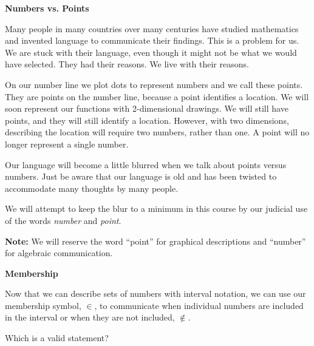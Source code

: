 \documentclass{ximera}
\begin{document}
\begin{warning}  \textbf{\textcolor{red!70!black}{Numbers vs. Points}} 

Many people in many countries over many centuries have studied mathematics and invented language to communicate their findings. This is a problem for us. We are stuck with their language, even though it might not be what we would have selected. They had their reasons.  We live with their reasons.

On our number line we plot dots to represent numbers and we call these points.  They are points on the number line, because a point identifies a location.  We will soon represent our functions with 2-dimensional drawings. We will still have points, and they will still identify a location.  However, with two dimensions, describing the location will require two numbers, rather than one.  A point will no longer represent a single number.

Our language will become a little blurred when we talk about points versus numbers.  Just be aware that our language is old and has been twisted to accommodate many thoughts by many people.


We will attempt to keep the blur to a minimum in this course by our judicial use of the words \textit{number} and \textit{point}.

\textbf{Note:} We will reserve the word ``point'' for graphical descriptions and ``number'' for algebraic communication.
\end{warning}








\begin{notation}  \textbf{\textcolor{red!50!green}{Membership}} 

Now that we can describe sets of numbers with interval notation, we can use our membership symbol, $\in$, to communicate when individual numbers are included in the interval or when they are not included, $\notin$.

\end{notation}








\begin{question} 


Which is a valid statement?
    \begin{multipleChoice}
    \choice {$ 2 \in [3, -2)$}
    \choice [correct]{$-2 \in [-2, 3)$}
    \end{multipleChoice}
\end{question}
\end{document}
